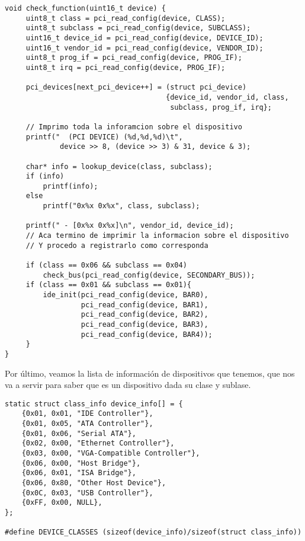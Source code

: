 \begin{lstlisting}[style=customcmucho]
void check_function(uint16_t device) {
     uint8_t class = pci_read_config(device, CLASS);
     uint8_t subclass = pci_read_config(device, SUBCLASS);
     uint16_t device_id = pci_read_config(device, DEVICE_ID);
     uint16_t vendor_id = pci_read_config(device, VENDOR_ID);
     uint8_t prog_if = pci_read_config(device, PROG_IF);
     uint8_t irq = pci_read_config(device, PROG_IF);

     pci_devices[next_pci_device++] = (struct pci_device) 
                                      {device_id, vendor_id, class, 
                                       subclass, prog_if, irq};

     // Imprimo toda la inforamcion sobre el dispositivo
     printf("  (PCI DEVICE) (%d,%d,%d)\t", 
             device >> 8, (device >> 3) & 31, device & 3);

     char* info = lookup_device(class, subclass);
     if (info)
         printf(info);
     else
         printf("0x%x 0x%x", class, subclass);

     printf(" - [0x%x 0x%x]\n", vendor_id, device_id);
     // Aca termino de imprimir la informacion sobre el dispositivo
     // Y procedo a registrarlo como corresponda
     
     if (class == 0x06 && subclass == 0x04)
         check_bus(pci_read_config(device, SECONDARY_BUS));
     if (class == 0x01 && subclass == 0x01){
         ide_init(pci_read_config(device, BAR0),
                  pci_read_config(device, BAR1),
                  pci_read_config(device, BAR2),
                  pci_read_config(device, BAR3),
                  pci_read_config(device, BAR4));
     }
}
\end{lstlisting}


Por último, veamos la lista de información de dispositivos que tenemos, que nos va a servir para saber que es un dispositivo dada su clase y sublase.

\begin{lstlisting}[style=customcmucho]
static struct class_info device_info[] = {
    {0x01, 0x01, "IDE Controller"},
    {0x01, 0x05, "ATA Controller"},
    {0x01, 0x06, "Serial ATA"},
    {0x02, 0x00, "Ethernet Controller"},
    {0x03, 0x00, "VGA-Compatible Controller"},
    {0x06, 0x00, "Host Bridge"},
    {0x06, 0x01, "ISA Bridge"},
    {0x06, 0x80, "Other Host Device"},
    {0x0C, 0x03, "USB Controller"},
    {0xFF, 0x00, NULL},
};

#define DEVICE_CLASSES (sizeof(device_info)/sizeof(struct class_info))
\end{lstlisting}



